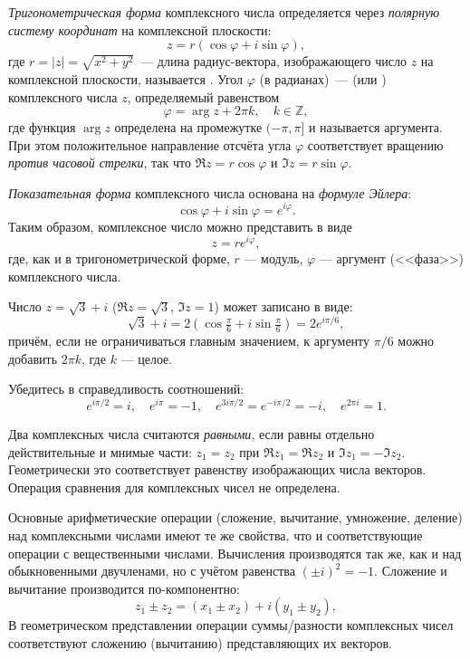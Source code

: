 \begin{labsupplement}
    \emph{Тригонометрическая форма} комплексного числа определяется через
    \emph{полярную систему координат} на комплексной плоскости:
    \[
        z = r\left(\cos\varphi + i\sin\varphi\right),
    \]
где $r = \left| z \right| = \sqrt{x^{2} + y^{2}}$~--- длина
    радиус-вектора, изображающего число $z$ на комплексной плоскости,
    называется . Угол $\varphi$ (в радианах)~---
     (или ) комплексного числа $z$, определяемый равенством
    \[
        \varphi = \arg z + 2 \pi k,\quad k \in \mathbb{Z},
    \]
    где функция $\arg z$ определена на промежутке $(-\pi,\pi]$
    и называется  аргумента.
    При этом положительное направление отсчёта угла $\varphi$
    соответствует вращению \emph{против часовой стрелки}, так что
    $\Re z = r\cos\varphi$ и $\Im z = r\sin\varphi$.

    \emph{Показательная форма} комплексного числа основана на \emph{формуле
    Эйлера}:
    \[
\cos \varphi + i \sin \varphi = e^{i\varphi}.
    \]
    Таким образом, комплексное число можно представить в виде
    \[
    z = re^{i\varphi},
    \]
    где, как и в тригонометрической форме, $r$ --- модуль, $\varphi$ ---
    аргумент (<<фаза>>) комплексного числа.

    \begin{lab:example}
    Число $z=\sqrt{3} + i$ ($\Re z = \sqrt{3}$, $\Im z = 1$) может записано в виде:
    \[
        \sqrt{3} + i = 2\left(\cos\tfrac{\pi}{6} + i\sin\tfrac{\pi}{6}\right) =
        2e^{i\pi/6},
    \]
    причём, если не ограничиваться главным значением,
    к аргументу $\pi/6$ можно добавить $2\pi k$, где $k$ --- целое.
    \end{lab:example}

    \begin{lab:exercise}
     Убедитесь в справедливость соотношений:
     \[
      e^{i\pi/2} = i,\quad e^{i\pi} = -1,\quad e^{3i\pi/2} = e^{-i\pi/2} =-i,\quad
      e^{2\pi i} = 1.
     \]
    \end{lab:exercise}

    Два комплексных числа считаются
    \emph{равными}, если равны отдельно действительные и мнимые части:
    $z_1 = z_2$ при $\Re z_1=\Re z_2$ и $\Im z_1=-\Im z_2$. Геометрически
    это соответствует равенству изображающих числа векторов.
    Операция сравнения для комплексных чисел не определена.




    Основные арифметические операции (сложение, вычитание, умножение, деление)
    над комплексными числами имеют те же свойства, что и соответствующие операции с вещественными числами.
    Вычисления производятся так же, как и над обыкновенными двучленами,
    но с учётом равенства $(\pm i)^{2} = - 1$.
    Сложение и вычитание производится по-компонентно:
    \[
     z_1 \pm z_2 = (x_1 \pm x_2) + i (y_1 \pm y_2),
    \]
    В геометрическом представлении операции суммы/разности комплексных чисел соответствуют
    сложению (вычитанию) представляющих их векторов.


\end{labsupplement}
